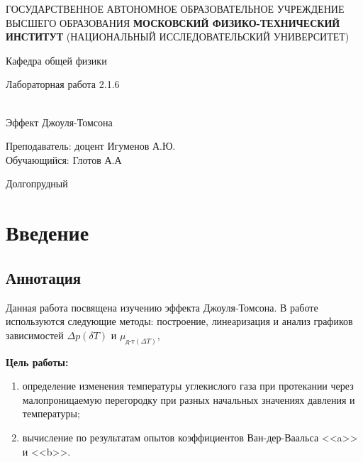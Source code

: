 \documentclass[12pt,a4paper]{article}
\author{Глотов Алексей}
\begin{document}
\newpage
\begin{center}
\footnotesize{{ГОСУДАРСТВЕННОЕ АВТОНОМНОЕ ОБРАЗОВАТЕЛЬНОЕ УЧРЕЖДЕНИЕ}\break
{ВЫСШЕГО ОБРАЗОВАНИЯ}
\break
{\bf {МОСКОВСКИЙ ФИЗИКО-ТЕХНИЧЕСКИЙ ИНСТИТУТ}}
\break
\small{(НАЦИОНАЛЬНЫЙ ИССЛЕДОВАТЕЛЬСКИЙ УНИВЕРСИТЕТ)}}
\break
\hfill \break
\hfill \break
\begin{center}
\normalsize{Кафедра общей физики}
\end{center}
\hfill \break
\hfill \break
\hfill \break
\hfill \break

\begin{center}
\normalsize {Лабораторная работа 2.1.6}
\end{center}
\hfill \break\\
\large{Эффект Джоуля-Томсона}
\end{center}
\begin{flushleft}
\hfill \break
\hfill \break
\hfill \break
\hfill \break
\hfill \break
\hfill \break
\hfill \break
\hfill \break
\hfill \break
\hfill \break
\hangindent=9cm
\normalsize{Преподаватель:}\hfill
\normalsize{доцент Игуменов А.Ю.}\\
\hfill \break
\normalsize{Обучающийся:}\hfill
\normalsize{Глотов А.А} \\
\hfill \break
\end{flushleft}
\hfill \break
\hfill \break
\hfill \break
\hfill \break
\hfill \break
\hfill \break
\hfill \break
\hfill \break
\hfill \break
\hfill \break
\hfill \break

\begin{center}
Долгопрудный 
\end{center}
\thispagestyle{empty}
\newpage
\section{Введение}

\subsection{Аннотация}

Данная работа посвящена изучению эффекта Джоуля-Томсона. В работе используются следующие методы: построение, линеаризация и анализ графиков зависимостей $\Delta{p}(\delta{T})$ и $\mu_{\text{д-т}(\Delta{T})}$, 

\textbf{Цель работы:}  \begin{enumerate}
	\item определение изменения температуры углекислого газа при протекании через малопроницаемую перегородку при разных начальных значениях давления и температуры;
	\item вычисление по результатам опытов коэффициентов Ван-дер-Ваальса <<a>> и <<b>>.
\end{enumerate}
\end{document}
